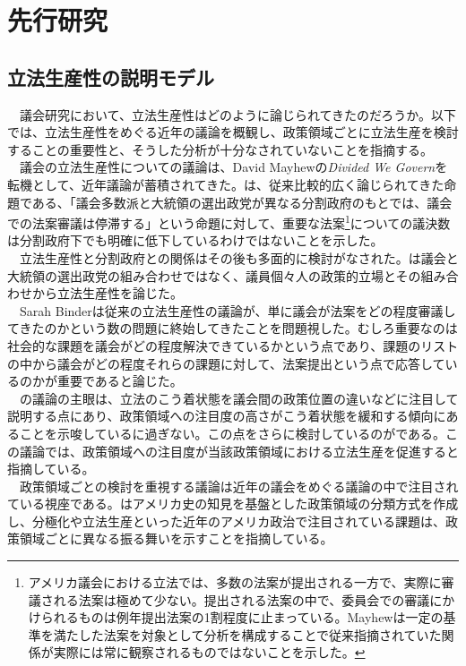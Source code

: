 \documentclass[here]{article}
\begin{document}
\section{先行研究}
\subsection{立法生産性の説明モデル}
　議会研究において、立法生産性はどのように論じられてきたのだろうか。以下では、立法生産性をめぐる近年の議論を概観し、政策領域ごとに立法生産を検討することの重要性と、そうした分析が十分なされていないことを指摘する。\\
　議会の立法生産性についての議論は、David Mayhewの\textit{Divided We Govern}を転機として、近年議論が蓄積されてきた。\citet*{Mayhew1991-rq}は、従来比較的広く論じられてきた命題である、「議会多数派と大統領の選出政党が異なる分割政府のもとでは、議会での法案審議は停滞する」という命題に対して、重要な法案\footnote{アメリカ議会における立法では、多数の法案が提出される一方で、実際に審議される法案は極めて少ない。提出される法案の中で、委員会での審議にかけられるものは例年提出法案の1割程度に止まっている。Mayhewは一定の基準を満たした法案を対象として分析を構成することで従来指摘されていた関係が実際には常に観察されるものではないことを示した。}についての議決数は分割政府下でも明確に低下しているわけではないことを示した。\\
　立法生産性と分割政府との関係はその後も多面的に検討がなされた。\citet*{Krehbiel1998-ob,Krehbiel2010-ob}は議会と大統領の選出政党の組み合わせではなく、議員個々人の政策的立場とその組み合わせから立法生産性を論じた。\\
　Sarah Binderは従来の立法生産性の議論が、単に議会が法案をどの程度審議してきたのかという数の問題に終始してきたことを問題視した。むしろ重要なのは社会的な課題を議会がどの程度解決できているかという点であり、課題のリストの中から議会がどの程度それらの課題に対して、法案提出という点で応答しているのかが重要であると論じた。\citep*{Binder2003-bn,Binder2017-wr}\\
　\citet*{Binder2003-bn}の議論の主眼は、立法のこう着状態を議会間の政策位置の違いなどに注目して説明する点にあり、政策領域への注目度の高さがこう着状態を緩和する傾向にあることを示唆しているに過ぎない。この点をさらに検討しているのが\citet*{Adler2013-ay}である。この議論では、政策領域への注目度が当該政策領域における立法生産を促進すると指摘している。\\
　政策領域ごとの検討を重視する議論は近年の議会をめぐる議論の中で注目されている視座である。\citet*{Lapinski2008-lr,Lapinski2013-jl}はアメリカ史の知見を基盤とした政策領域の分類方式を作成し、分極化や立法生産といった近年のアメリカ政治で注目されている課題は、政策領域ごとに異なる振る舞いを示すことを指摘している。\\
\end{document}
